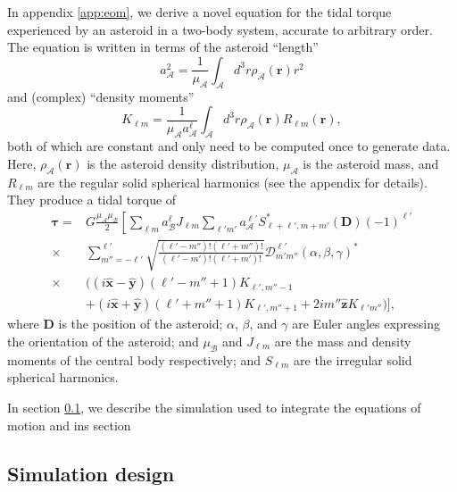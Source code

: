\documentclass[fleqn,usenatbib]{mnras}
\newcommand{\unit}[1]{\bm{\hat{#1}}}
\begin{document}
In appendix \ref{app:eom}, we derive a novel equation for the tidal torque experienced by an asteroid in a two-body system, accurate to arbitrary order. The equation is written in terms of the asteroid ``length'' 
\begin{equation}
  a_\mathcal{A}^2 = \frac{1}{\mu_\mathcal{A}} \int_\mathcal{A} d^3 r \rho_\mathcal{A}(\bm r) r^2
  \label{eqn:am}
\end{equation}
and (complex) ``density moments''
\begin{equation}
  K_{\ell m} = \frac{1}{\mu_\mathcal{A} a_\mathcal{A}^\ell} \int_\mathcal{A} d^3 r \rho_\mathcal{A}(\bm r) R_{\ell m}(\bm r),
  \label{eqn:klm}
\end{equation}
both of which are constant and only need to be computed once to generate data. Here, $\rho_\mathcal{A}(\bm r)$ is the asteroid density distribution, $\mu_\mathcal{A}$ is the asteroid mass, and $R_{\ell m}$ are the regular solid spherical harmonics (see the appendix for details). They produce a tidal torque of 
\begin{equation}
  \begin{split}
  \bm \tau = & G\frac{\mu_\mathcal{A}\mu_\mathcal{B}}{2}\left[\sum_{\ell m} a_\mathcal{B}^\ell J_{\ell m} \sum_{\ell' m'}a_\mathcal{A}^{\ell'}S^*_{\ell+\ell', m + m'} (\bm D) (-1)^{\ell'}\right.\\
  \times & \left.\sum_{m''=-\ell'}^{\ell'} \sqrt{\frac{(\ell'-m'')!(\ell'+m'')!}{(\ell'-m')!(\ell'+m')!}}  \mathcal{D}^{\ell'}_{m'm''}(\alpha, \beta, \gamma)^* \right. \\
  \times & \Big((i\unit x - \unit y)(\ell'-m''+1)K_{\ell',m''-1} \\
  & +(i\unit x+\unit y)(\ell'+m''+1)K_{\ell',m''+1}+2im''\unit z K_{\ell'm''}\Big) \Bigg],
  \end{split}
  \label{eqn:tidal-torque}
\end{equation}
where $\bm D$ is the position of the asteroid; $\alpha$, $\beta$, and $\gamma$ are Euler angles expressing the orientation of the asteroid; and  $\mu_\mathcal{B}$ and $J_{\ell m}$ are the mass and density moments of the central body respectively; and $S_{\ell m}$ are the irregular solid spherical harmonics.

In section \ref{sec:sim}, we describe the simulation used to integrate the equations of motion and ins section 


\subsection{Simulation design}
\label{sec:sim}
\end{document}
